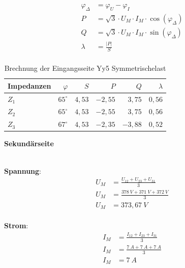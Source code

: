 \begin{enumerate}[label=\alph*)]
	      \begin{center}
		      \begin{align*}
			      \varphi_{\Delta} & = \varphi_{U} - \varphi_{I}                             \\
			      P                & = \sqrt{3}\cdot U_M\cdot I_M\cdot\cos(\varphi_{\Delta}) \\
			      Q                & = \sqrt{3}\cdot U_M\cdot I_M\cdot\sin(\varphi_{\Delta}) \\
			      \lambda          & = \frac{|P|}{S}                                         \\
		      \end{align*}
	      \end{center}

	      \begin{table}[h!]
		      \caption{Brechnung der Eingangsseite Yy5 Symmetrischelast}
		      \centering
		      \begin{tabular}{lrrrrr}
			      \hline
			      Impedanzen & $\varphi$    & $S$    & $P$      & $Q$      & $\lambda$ \\ \hline
			      $Z_1$      & $65  ^\circ$ & $4,53$ & $-2,55$  & $ 3,75 $ & $0,56$    \\
			      $Z_2$      & $65^\circ$   & $4,53$ & $-2,55 $ & $ 3,75$  & $0,56$    \\
			      $Z_3$      & $67^\circ  $ & $4,53$ & $-2,35$  & $ -3,88$ & $0,52$    \\ \hline
		      \end{tabular}
	      \end{table}

	      \textbf{Sekundärseite}\\ \ \\
	      \begin{minipage}{0.5\textwidth}
		      \textbf{Spannung}:
		      \begin{align*}
			      U_M & = \frac{U_{12} + U_{23} + U_{31}}{3} \\
			      U_M & = \frac{378\ V + 371\ V + 372\ V}{3} \\
			      U_M & = 373,67\ V                          \\
		      \end{align*}
	      \end{minipage}\hfill
	      \begin{minipage}{0.5\textwidth}
		      \textbf{Strom}:
		      \begin{align*}
			      I_M & = \frac{I_{12} + I_{23} + I_{31}}{3} \\
			      I_M & = \frac{7\ A + 7\ A + 7\ A}{3}       \\
			      I_M & = 7\ A                               \\
		      \end{align*}
	      \end{minipage}


\end{enumerate}
